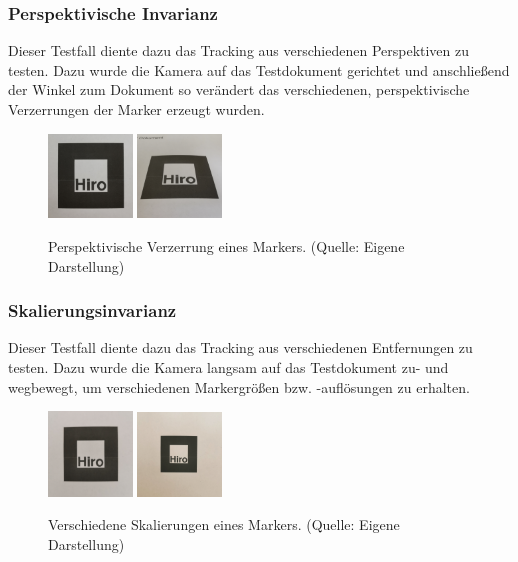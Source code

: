 \subsubsection{Perspektivische Invarianz}
Dieser Testfall diente dazu das Tracking aus verschiedenen Perspektiven zu testen. Dazu wurde die Kamera auf das Testdokument gerichtet und anschließend der Winkel zum Dokument so verändert das verschiedenen, perspektivische Verzerrungen der Marker erzeugt wurden.

\begin{figure}[H]
	\centering
    \includegraphics[width=0.2\textwidth]{Abbildungen/Invarianz/Perspektive1.jpg}
    \includegraphics[width=0.2\textwidth]{Abbildungen/Invarianz/Perspektive2.jpg}
    \caption[Perspektiven eines Markers]{Perspektivische Verzerrung eines Markers. (Quelle: Eigene Darstellung)}
\end{figure}

\subsubsection{Skalierungsinvarianz} Dieser Testfall diente dazu das Tracking aus verschiedenen Entfernungen zu testen. Dazu wurde die Kamera langsam auf das Testdokument zu- und wegbewegt, um verschiedenen Markergrößen bzw. -auflösungen zu erhalten.

\begin{figure}[H]
    \centering
    \includegraphics[width=0.2\textwidth]{Abbildungen/Invarianz/Skalierung1.jpg}
    \includegraphics[width=0.2\textwidth]{Abbildungen/Invarianz/Skalierung2.jpg}
    \caption[Skalierungen eines Markers]{Verschiedene Skalierungen eines Markers. (Quelle: Eigene Darstellung)}
\end{figure}

